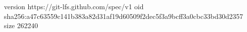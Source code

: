 version https://git-lfs.github.com/spec/v1
oid sha256:a47c63559c141b383a82d31af19d60509f2dec5f3a9bcff3a0cbc33bd30d2357
size 262240
